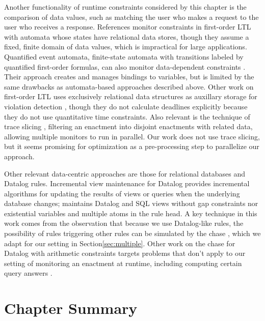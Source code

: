 Another functionality of runtime constraints
considered by this chapter
is the comparison of data values,
such as matching the user who makes a request
to the user who receives a response.
References \cite{de2013runtime,riccardo2014monitoringfsa}
monitor constraints in first-order LTL
with automata whose states have relational data stores,
though they assume a fixed, finite domain of data values,
which is impractical for large applications.
Quantified event automata, finite-state automata
with transitions labeled by quantified first-order formulas,
can also monitor data-dependent constraints
\cite{barringer2012quantified}.
Their approach creates and manages bindings to variables,
but is limited by the same drawbacks as
automata-based approaches described above.
Other work on first-order LTL uses exclusively relational data structures
as auxillary storage for violation detection
\cite{Chomicki95:TODS,halle2012runtime,basin2015monitoring,havelund2018efficient},
though they do not calculate deadlines explicitly
because they do not use quantitative time constraints.
Also relevant is the technique of trace slicing
\cite{chen2009parametric},
filtering an enactment
into disjoint enactments with related data,
allowing multiple monitors to run in parallel.
Our work does not use trace slicing,
but it seems promising for optimization
as a pre-processing step
to parallelize our approach.


Other relevant data-centric approaches
are those for relational databases and Datalog rules.
Incremental view maintenance
for Datalog provides incremental algorithms
for updating the results of views or queries
when the underlying database changes;
\cite{gupta1993maintaining} maintains
Datalog and SQL views
without gap constraints
nor existential variables and multiple atoms in the rule head.
A key technique in this work comes from the observation that
because we use Datalog-like rules,
the possibility of rules triggering other rules
can be simulated by the chase \cite{AHV95},
which we adapt for our setting in Section\:\ref{sec:multiple}.
Other work on the chase
for Datalog with arithmetic constraints
targets problems that don't apply to our setting
of monitoring an enactment at runtime,
including computing certain query answers \cite{afrati2008data, ten2013data}.

\section{Chapter Summary}
\label{sec:rules-data-conclusion}

